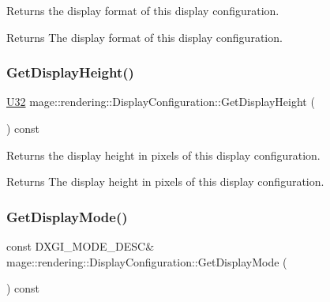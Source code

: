 Returns the display format of this display configuration.

\begin{DoxyReturn}{Returns}
The display format of this display configuration. 
\end{DoxyReturn}
\mbox{\label{classmage_1_1rendering_1_1_display_configuration_aaf77044b835d6302305913cf469b7246}} 
\subsubsection{\texorpdfstring{Get\+Display\+Height()}{GetDisplayHeight()}}
{\footnotesize\ttfamily \mbox{\hyperlink{namespacemage_a41c104c036fba3756a74e19f793eeaa1}{U32}} mage\+::rendering\+::\+Display\+Configuration\+::\+Get\+Display\+Height (\begin{DoxyParamCaption}{ }\end{DoxyParamCaption}) const\hspace{0.3cm}{\ttfamily [noexcept]}}

Returns the display height in pixels of this display configuration.

\begin{DoxyReturn}{Returns}
The display height in pixels of this display configuration. 
\end{DoxyReturn}
\mbox{\label{classmage_1_1rendering_1_1_display_configuration_af3cd8d29b8f6d6bc0fa1579260badf99}} 
\subsubsection{\texorpdfstring{Get\+Display\+Mode()}{GetDisplayMode()}}
{\footnotesize\ttfamily const D\+X\+G\+I\+\_\+\+M\+O\+D\+E\+\_\+\+D\+E\+SC\& mage\+::rendering\+::\+Display\+Configuration\+::\+Get\+Display\+Mode (\begin{DoxyParamCaption}{ }\end{DoxyParamCaption}) const\hspace{0.3cm}{\ttfamily [noexcept]}}

